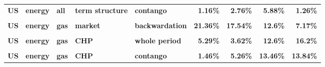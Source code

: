 \documentclass[
  authoryear,
  preprint,
  3p]{elsarticle}
\begin{document}
\begin{landscape}
\begin{longtable}[t]{>{}l>{}l>{}l>{}l>{}l>{}r>{}r>{}r>{}r}
\textbf{US} & \textbf{energy} & \textbf{all} & \textbf{term structure} & \textbf{contango} & \textcolor[HTML]{4285f4}{\textbf{1.16\%}} & \textcolor[HTML]{4285f4}{\textbf{2.76\%}} & \textcolor[HTML]{4285f4}{\textbf{5.88\%}} & \textcolor[HTML]{4285f4}{\textbf{1.26\%}}\\
\textbf{\cellcolor{gray!10}{US}} & \textbf{\cellcolor{gray!10}{energy}} & \textbf{\cellcolor{gray!10}{gas}} & \textbf{\cellcolor{gray!10}{market}} & \textbf{\cellcolor{gray!10}{whole period}} & \textcolor[HTML]{4285f4}{\textbf{\cellcolor{gray!10}{19.37\%}}} & \textcolor[HTML]{4285f4}{\textbf{\cellcolor{gray!10}{18.38\%}}} & \textcolor[HTML]{4285f4}{\textbf{\cellcolor{gray!10}{10.88\%}}} & \textcolor[HTML]{4285f4}{\textbf{\cellcolor{gray!10}{7.86\%}}}\\
\addlinespace
\textbf{US} & \textbf{energy} & \textbf{gas} & \textbf{market} & \textbf{backwardation} & \textcolor[HTML]{4285f4}{\textbf{21.36\%}} & \textcolor[HTML]{4285f4}{\textbf{17.54\%}} & \textcolor[HTML]{4285f4}{\textbf{12.6\%}} & \textcolor[HTML]{4285f4}{\textbf{7.17\%}}\\
\textbf{\cellcolor{gray!10}{US}} & \textbf{\cellcolor{gray!10}{energy}} & \textbf{\cellcolor{gray!10}{gas}} & \textbf{\cellcolor{gray!10}{market}} & \textbf{\cellcolor{gray!10}{contango}} & \textcolor[HTML]{4285f4}{\textbf{\cellcolor{gray!10}{17.12\%}}} & \textcolor[HTML]{4285f4}{\textbf{\cellcolor{gray!10}{20.07\%}}} & \textcolor[HTML]{4285f4}{\textbf{\cellcolor{gray!10}{9.92\%}}} & \textcolor[HTML]{4285f4}{\textbf{\cellcolor{gray!10}{7.96\%}}}\\
\textbf{US} & \textbf{energy} & \textbf{gas} & \textbf{CHP} & \textbf{whole period} & \textcolor[HTML]{4285f4}{\textbf{5.29\%}} & \textcolor[HTML]{4285f4}{\textbf{3.62\%}} & \textcolor[HTML]{4285f4}{\textbf{12.6\%}} & \textcolor[HTML]{4285f4}{\textbf{16.2\%}}\\
\textbf{\cellcolor{gray!10}{US}} & \textbf{\cellcolor{gray!10}{energy}} & \textbf{\cellcolor{gray!10}{gas}} & \textbf{\cellcolor{gray!10}{CHP}} & \textbf{\cellcolor{gray!10}{backwardation}} & \textcolor[HTML]{4285f4}{\textbf{\cellcolor{gray!10}{10.16\%}}} & \textcolor[HTML]{4285f4}{\textbf{\cellcolor{gray!10}{2.14\%}}} & \textcolor[HTML]{4285f4}{\textbf{\cellcolor{gray!10}{11.42\%}}} & \textcolor[HTML]{4285f4}{\textbf{\cellcolor{gray!10}{19.3\%}}}\\
\textbf{US} & \textbf{energy} & \textbf{gas} & \textbf{CHP} & \textbf{contango} & \textcolor[HTML]{4285f4}{\textbf{1.46\%}} & \textcolor[HTML]{4285f4}{\textbf{5.26\%}} & \textcolor[HTML]{4285f4}{\textbf{13.46\%}} & \textcolor[HTML]{4285f4}{\textbf{13.84\%}}\\

\end{longtable}
\end{landscape}
\end{document}
